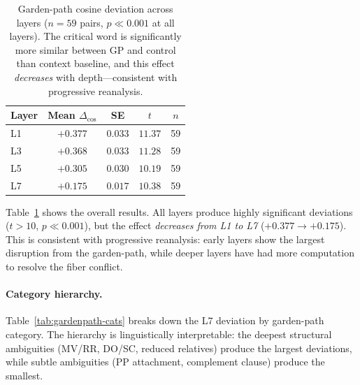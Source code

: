 \documentclass[11pt]{article}
\begin{document}
\begin{table}[t]
\centering
\small
\begin{tabular}{@{}lcccc@{}}
\toprule
\textbf{Layer} & \textbf{Mean $\Delta_{\cos}$} & \textbf{SE} & \textbf{$t$} & \textbf{$n$} \\
\midrule
L1 & $+0.377$ & $0.033$ & $11.37$ & 59 \\
L3 & $+0.368$ & $0.033$ & $11.28$ & 59 \\
L5 & $+0.305$ & $0.030$ & $10.19$ & 59 \\
L7 & $+0.175$ & $0.017$ & $10.38$ & 59 \\
\bottomrule
\end{tabular}
\caption{Garden-path cosine deviation across layers ($n=59$ pairs, 
$p \ll 0.001$ at all layers). The critical word is significantly more 
similar between GP and control than context baseline, and this effect 
\emph{decreases} with depth---consistent with progressive reanalysis.}
\label{tab:gardenpath-overall}
\end{table}

Table~\ref{tab:gardenpath-overall} shows the overall results. All layers 
produce highly significant deviations ($t > 10$, $p \ll 0.001$), but the 
effect \emph{decreases from L1 to L7} ($+0.377 \to +0.175$). This is 
consistent with progressive reanalysis: early layers show the largest 
disruption from the garden-path, while deeper layers have had more 
computation to resolve the fiber conflict.

\paragraph{Category hierarchy.}
Table~\ref{tab:gardenpath-cats} breaks down the L7 deviation by 
garden-path category. The hierarchy is linguistically interpretable: 
the deepest structural ambiguities (MV/RR, DO/SC, reduced relatives) 
produce the largest deviations, while subtle ambiguities (PP attachment, 
complement clause) produce the smallest.
\end{document}
